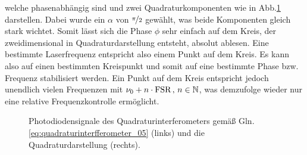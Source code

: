 welche phasenabhängig sind und zwei Quadraturkomponenten wie in
Abb.\ref{fig:quadratursignale} darstellen. Dabei wurde ein $\alpha$ von
$\nicefrac{\pi}{2}$ gewählt, was beide Komponenten gleich stark wichtet. Somit
lässt sich die Phase $\phi$ sehr einfach auf dem Kreis, der zweidimensional in
Quadraturdarstellung entsteht, absolut ablesen.
Eine bestimmte Laserfrequenz entspricht also einem Punkt auf dem Kreis. Es kann also
auf einen bestimmten Kreispunkt und somit auf eine bestimmte Phase bzw. Frequenz
stabilisiert werden. Ein Punkt auf dem Kreis entspricht jedoch unendlich vielen
Frequenzen mit $\nu_0+n\cdot\text{FSR}\,,\,n\in\mathbb{N}$, was demzufolge wieder nur
eine relative Frequenzkontrolle ermöglicht.
\begin{figure}[h]
	\centering
	\footnotesize
	
	\caption[Quadratursignale]{Photodiodensignale des Quadraturinterferometers
	gemäß Gln. \eqref{eq:quadraturinterfferometer_05} (links) und die
	Quadraturdarstellung (rechts).}
	\label{fig:quadratursignale}
\end{figure}

